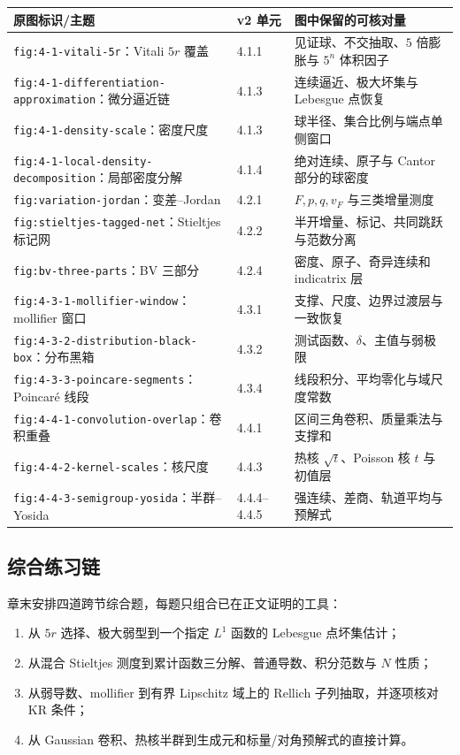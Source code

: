 \documentclass[11pt,a4paper]{ctexart}
\begin{document}
\begin{longtable}{p{}p{}p{}}
\toprule
原图标识/主题 & v2 单元 & 图中保留的可核对量\\
\midrule
\texttt{fig:4-1-vitali-5r}：Vitali $5r$ 覆盖 & 4.1.1 & 见证球、不交抽取、$5$ 倍膨胀与 $5^n$ 体积因子\\
\texttt{fig:4-1-differentiation-approximation}：微分逼近链 & 4.1.3 & 连续逼近、极大坏集与 Lebesgue 点恢复\\
\texttt{fig:4-1-density-scale}：密度尺度 & 4.1.3 & 球半径、集合比例与端点单侧窗口\\
\texttt{fig:4-1-local-density-decomposition}：局部密度分解 & 4.1.4 & 绝对连续、原子与 Cantor 部分的球密度\\
\texttt{fig:variation-jordan}：变差--Jordan & 4.2.1 & $F,p,q,v_F$ 与三类增量测度\\
\texttt{fig:stieltjes-tagged-net}：Stieltjes 标记网 & 4.2.2 & 半开增量、标记、共同跳跃与范数分离\\
\texttt{fig:bv-three-parts}：BV 三部分 & 4.2.4 & 密度、原子、奇异连续和 indicatrix 层\\
\texttt{fig:4-3-1-mollifier-window}：mollifier 窗口 & 4.3.1 & 支撑、尺度、边界过渡层与一致恢复\\
\texttt{fig:4-3-2-distribution-black-box}：分布黑箱 & 4.3.2 & 测试函数、$\delta$、主值与弱极限\\
\texttt{fig:4-3-3-poincare-segments}：Poincar\'e 线段 & 4.3.4 & 线段积分、平均零化与域尺度常数\\
\texttt{fig:4-4-1-convolution-overlap}：卷积重叠 & 4.4.1 & 区间三角卷积、质量乘法与支撑和\\
\texttt{fig:4-4-2-kernel-scales}：核尺度 & 4.4.3 & 热核 $\sqrt t$、Poisson 核 $t$ 与初值层\\
\texttt{fig:4-4-3-semigroup-yosida}：半群--Yosida & 4.4.4--4.4.5 & 强连续、差商、轨道平均与预解式\\
\bottomrule
\end{longtable}

\subsection{综合练习链}

章末安排四道跨节综合题，每题只组合已在正文证明的工具：
\begin{enumerate}
\item 从 $5r$ 选择、极大弱型到一个指定 $L^1$ 函数的 Lebesgue 点坏集估计；
\item 从混合 Stieltjes 测度到累计函数三分解、普通导数、积分范数与 $N$ 性质；
\item 从弱导数、mollifier 到有界 Lipschitz 域上的 Rellich 子列抽取，并逐项核对 KR 条件；
\item 从 Gaussian 卷积、热核半群到生成元和标量/对角预解式的直接计算。
\end{enumerate}
\end{document}
